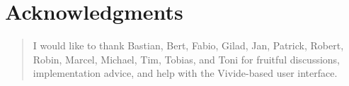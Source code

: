 \begingroup
\let\raggedsection\centering

\chapter*{Acknowledgments}
\label{cha:acknowledgments}
\endgroup
\begin{quotation}
\noindent
I would like to thank Bastian, Bert, Fabio, Gilad, Jan, Patrick, Robert, Robin, Marcel, Michael, Tim, Tobias, and Toni for fruitful discussions, implementation advice, and help with the Vivide-based user interface.
\end{quotation}
